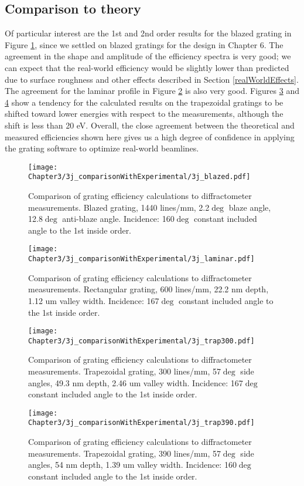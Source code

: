 \subsection{Comparison to theory}
Of particular interest are the 1st and 2nd order results for the blazed grating in Figure \ref{3j-1}, since we settled on blazed gratings for the design in Chapter 6.  The agreement in the shape and amplitude of the efficiency spectra is very good; we can expect that the real-world efficiency would be slightly lower than predicted due to surface roughness and other effects described in Section \ref{realWorldEffects}.  The agreement for the laminar profile in Figure \ref{3j-2} is also very good.  Figures \ref{3j-3} and \ref{3j-4} show a tendency for the calculated results on the trapezoidal gratings to be shifted toward lower energies with respect to the measurements, although the shift is less than 20 eV.  Overall, the close agreement between the theoretical and measured efficiencies shown here gives us a high degree of confidence in applying the grating software to optimize real-world beamlines.
 
\begin{figure}[htbp] %
   \centering
   \texttt{[image: Chapter3/3j\_comparisonWithExperimental/3j\_blazed.pdf]} 
   \caption{Comparison of grating efficiency calculations to diffractometer measurements.  Blazed grating, 1440 lines/mm, 2.2$\deg$ blaze angle, 12.8$\deg$ anti-blaze angle. Incidence: 160$\deg$ constant included angle to the 1st inside order.}
   \label{3j-1}
\end{figure}

\begin{figure}[htbp] %
   \centering
   \texttt{[image: Chapter3/3j\_comparisonWithExperimental/3j\_laminar.pdf]} 
   \caption{Comparison of grating efficiency calculations to diffractometer measurements.  Rectangular grating, 600 lines/mm, 22.2 nm depth, 1.12 um valley width.  Incidence: 167$\deg$ constant included angle to the 1st inside order.}
   \label{3j-2}
\end{figure}

\begin{figure}[htbp] %
   \centering
   \texttt{[image: Chapter3/3j\_comparisonWithExperimental/3j\_trap300.pdf]} 
   \caption{Comparison of grating efficiency calculations to diffractometer measurements.  Trapezoidal grating, 300 lines/mm, 57$\deg$ side angles, 49.3 nm depth, 2.46 um valley width.  Incidence: 167$\deg$ constant included angle to the 1st inside order.}
   \label{3j-3}
\end{figure}

\begin{figure}[htbp] %
   \centering
   \texttt{[image: Chapter3/3j\_comparisonWithExperimental/3j\_trap390.pdf]} 
   \caption{Comparison of grating efficiency calculations to diffractometer measurements.  Trapezoidal grating, 390 lines/mm, 57$\deg$ side angles, 54 nm depth, 1.39 um valley width.  Incidence: 160$\deg$ constant included angle to the 1st inside order.}
   \label{3j-4}
\end{figure}
